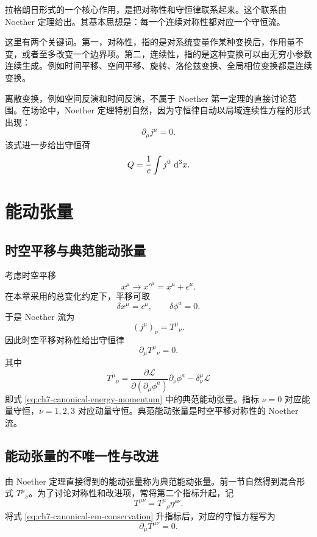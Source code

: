 拉格朗日形式的一个核心作用，是把对称性和守恒律联系起来。这个联系由 Noether 定理给出。其基本思想是：每一个连续对称性都对应一个守恒流。

这里有两个关键词。第一，对称性，指的是对系统变量作某种变换后，作用量不变，或者至多改变一个边界项。第二，连续性，指的是这种变换可以由无穷小参数连续生成。例如时间平移、空间平移、旋转、洛伦兹变换、全局相位变换都是连续变换。

离散变换，例如空间反演和时间反演，不属于 Noether 第一定理的直接讨论范围。在场论中，Noether 定理特别自然，因为守恒律自动以局域连续性方程的形式出现：
\[
\partial_{\mu}j^{\mu}=0.
\]
该式进一步给出守恒荷
\[
Q=\frac{1}{c}\int j^{0}\,\mathop{}\!\mathrm{d}^{3}x.
\]

\section{能动张量}

\subsection{时空平移与典范能动张量}

考虑时空平移
\[
x^{\mu}\rightarrow x'^{\mu}=x^{\mu}+\epsilon^{\mu}.
\]
在本章采用的总变化约定下，平移可取
\[
\delta x^{\mu}=\epsilon^{\mu},
\qquad
\delta\phi^{a}=0.
\]
于是 Noether 流为
\[
(j^{\mu})_{\nu}=T^{\mu}{}_{\nu}.
\]
因此时空平移对称性给出守恒律
\begin{equation}
	\partial_{\mu}T^{\mu}{}_{\nu}=0.
	\label{eq:ch7-canonical-em-conservation}
\end{equation}
其中
\[
T^{\mu}{}_{\nu}
=
\frac{\partial\mathcal{L}}{\partial(\partial_{\mu}\phi^{a})}
\partial_{\nu}\phi^{a}
-
\delta^{\mu}_{\nu}\mathcal{L}
\]
即式 \eqref{eq:ch7-canonical-energy-momentum} 中的典范能动张量。指标 $\nu=0$ 对应能量守恒，$\nu=1,2,3$ 对应动量守恒。典范能动张量是时空平移对称性的 Noether 流。

\subsection{能动张量的不唯一性与改进}

由 Noether 定理直接得到的能动张量称为典范能动张量。前一节自然得到混合形式 $T^{\mu}{}_{\nu}$。为了讨论对称性和改进项，常将第二个指标升起，记
\begin{equation}
	T^{\mu\nu}=T^{\mu}{}_{\rho}\eta^{\rho\nu}.
	\label{eq:ch7-raise-em-index}
\end{equation}
将式 \eqref{eq:ch7-canonical-em-conservation} 升指标后，对应的守恒方程写为
\[
\partial_{\mu}T^{\mu\nu}=0.
\]

